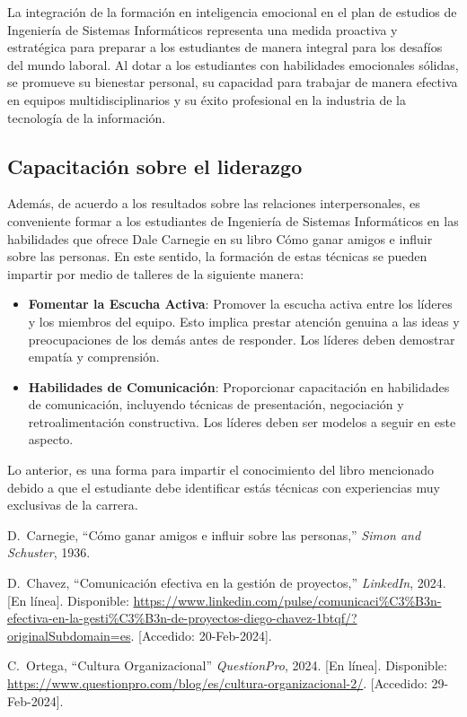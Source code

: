 \documentclass[journal]{IEEEtran}
\begin{document}
La integración de la formación en inteligencia emocional en el plan de estudios de Ingeniería de Sistemas Informáticos representa una medida proactiva y estratégica para preparar a los estudiantes de manera integral para los desafíos del mundo laboral. Al dotar a los estudiantes con habilidades emocionales sólidas, se promueve su bienestar personal, su capacidad para trabajar de manera efectiva en equipos multidisciplinarios y su éxito profesional en la industria de la tecnología de la información.

\subsection{Capacitación sobre el liderazgo}
Además, de acuerdo a los resultados sobre las relaciones interpersonales, es conveniente formar a los estudiantes de Ingeniería de Sistemas Informáticos en las habilidades que ofrece Dale Carnegie en su libro Cómo ganar amigos e influir sobre las personas. En este sentido, la formación de estas técnicas se pueden impartir por medio de talleres de la siguiente manera:
\begin{itemize}
	\item \textbf{Fomentar la Escucha Activa}: Promover la escucha activa entre los líderes y los miembros del equipo. Esto implica prestar atención genuina a las ideas y preocupaciones de los demás antes de responder. Los líderes deben demostrar empatía y comprensión.
	\item \textbf{Habilidades de Comunicación}: Proporcionar capacitación en habilidades de comunicación, incluyendo técnicas de presentación, negociación y retroalimentación constructiva. Los líderes deben ser modelos a seguir en este aspecto.
\end{itemize} 

Lo anterior, es una forma para impartir el conocimiento del libro mencionado debido a que el estudiante debe identificar estás técnicas con experiencias muy exclusivas de la carrera.

\begin{thebibliography}{1}
  
D.~Carnegie, ``Cómo ganar amigos e influir sobre las personas,'' \emph{Simon and Schuster}, 1936.
  
D.~Chavez, ``Comunicación efectiva en la gestión de proyectos,'' \emph{LinkedIn}, 2024. [En línea]. Disponible: \url{https://www.linkedin.com/pulse/comunicaci%C3%B3n-efectiva-en-la-gesti%C3%B3n-de-proyectos-diego-chavez-1btqf/?originalSubdomain=es}. [Accedido: 20-Feb-2024].

C.~Ortega,  ``Cultura Organizacional'' \emph{QuestionPro}, 2024. [En línea]. Disponible: \url{https://www.questionpro.com/blog/es/cultura-organizacional-2/}. [Accedido: 29-Feb-2024].

\end{thebibliography}
\end{document}
